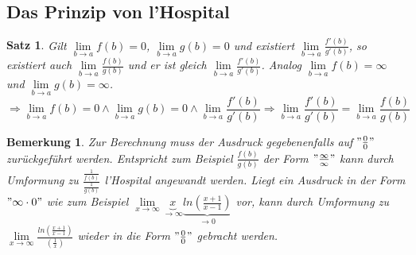\documentclass[12pt,a4paper]{article}%
\newtheorem{satz}{Satz}[section]
\newtheorem{bem}{Bemerkung}[section]
\numberwithin{equation}{section}
\numberwithin{equation}{subsection}
\begin{document}
  \subsection{Das Prinzip von l'Hospital}
  \begin{satz}
    Gilt $\lim\limits_{b\rightarrow a} f(b) = 0$, $\lim\limits_{b\rightarrow a} g(b) = 0$ und existiert $\lim\limits_{b\rightarrow a} \frac{f'(b)}{g'(b)}$, so existiert auch $\lim\limits_{b\rightarrow a} \frac{f(b)}{g(b)}$ und er ist gleich $\lim\limits_{b\rightarrow a} \frac{f'(b)}{g'(b)}$. Analog $\lim\limits_{b\rightarrow a} f(b) = \infty$ und $\lim\limits_{b\rightarrow a} g(b) = \infty$.
    \begin{equation}
      \Rightarrow \lim\limits_{b\rightarrow a} f(b) = 0 \land \lim\limits_{b\rightarrow a} g(b) = 0 \land \lim\limits_{b\rightarrow a} \frac{f'(b)}{g'(b)} \Rightarrow \lim\limits_{b\rightarrow a} \frac{f'(b)}{g'(b)} = \lim\limits_{b\rightarrow a} \frac{f(b)}{g(b)}
    \end{equation}
  \end{satz}
  \begin{bem}
    Zur Berechnung muss der Ausdruck gegebenenfalls auf $"\frac{0}{0}"$ zurückgeführt werden. Entspricht zum Beispiel $\frac{f(b)}{g(b)}$ der Form $"\frac{\infty}{\infty}"$ kann durch Umformung zu $\frac{\frac{1}{f(b)}}{\frac{1}{g(b)}}$ l'Hospital angewandt werden.\newline
    Liegt ein Ausdruck in der Form $"\infty \cdot 0"$ wie zum Beispiel $\lim\limits_{x\rightarrow \infty} \underbrace{x}_{\rightarrow \infty} \underbrace{ln\left(\frac{x+1}{x-1}\right)}_{\rightarrow 0 }$ vor, kann durch Umformung zu $\lim\limits_{x\rightarrow \infty} \frac{ln\left(\frac{x+1}{x-1}\right)}{\left(\frac{1}{x}\right)}$ wieder in die Form $"\frac{0}{0}"$ gebracht werden.
  \end{bem}
  \newpage
  
\end{document}
